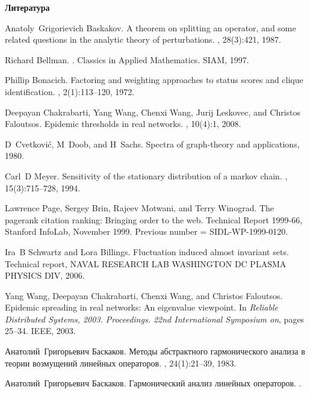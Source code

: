 \documentclass[12pt]{article}
\begin{document}
\smallskip\centerline{\bf Литература}
\begingroup
    \renewcommand{\section}[2]{}%
\begin{thebibliography}{10}

Anatoly~Grigorievich Baskakov.
\newblock A theorem on splitting an operator, and some related questions in the
  analytic theory of perturbations.
, 28(3):421, 1987.

Richard Bellman.
.
\newblock Classics in Applied Mathematics. SIAM, 1997.

Phillip Bonacich.
\newblock Factoring and weighting approaches to status scores and clique
  identification.
, 2(1):113--120, 1972.

Deepayan Chakrabarti, Yang Wang, Chenxi Wang, Jurij Leskovec, and Christos
  Faloutsos.
\newblock Epidemic thresholds in real networks.
,
  10(4):1, 2008.

D~Cvetkovi{\'c}, M~Doob, and H~Sachs.
\newblock Spectra of graph-theory and applications, 1980.

Carl~D Meyer.
\newblock Sensitivity of the stationary distribution of a markov chain.
,
  15(3):715--728, 1994.

Lawrence Page, Sergey Brin, Rajeev Motwani, and Terry Winograd.
\newblock The pagerank citation ranking: Bringing order to the web.
\newblock Technical Report 1999-66, Stanford InfoLab, November 1999.
\newblock Previous number = SIDL-WP-1999-0120.

Ira~B Schwartz and Lora Billings.
\newblock Fluctuation induced almost invariant sets.
\newblock Technical report, NAVAL RESEARCH LAB WASHINGTON DC PLASMA PHYSICS
  DIV, 2006.

Yang Wang, Deepayan Chakrabarti, Chenxi Wang, and Christos Faloutsos.
\newblock Epidemic spreading in real networks: An eigenvalue viewpoint.
\newblock In {\em Reliable Distributed Systems, 2003. Proceedings. 22nd
  International Symposium on}, pages 25--34. IEEE, 2003.

Анатолий~Григорьевич Баскаков.
\newblock Методы абстрактного гармонического
  анализа в теории возмущений линейных
  операторов.
, 24(1):21--39, 1983.

Анатолий~Григорьевич Баскаков.
\newblock Гармонический анализ линейных
  операторов.
.

\end{thebibliography}
\endgroup
\end{document}

